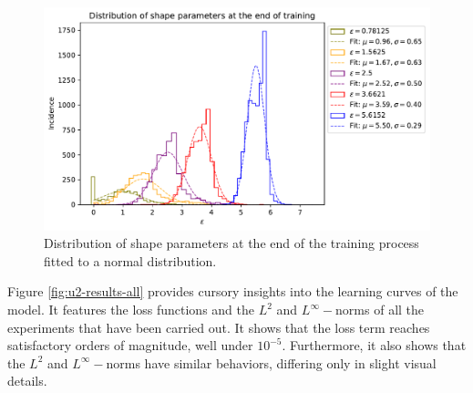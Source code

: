 \documentclass[12pt]{report} %
\begin{document}
\begin{figure}
  \includegraphics[width=\textwidth]{imagenes/experiments/1d/statistical_1d_full_scheduler_interpolation/distribution_of_shape_parameters_at_end_of_training.pdf}
  \caption{Distribution of shape parameters at the end of the training process fitted to a normal distribution.}
  \label{fig:u2-results-shape-parameters}
\end{figure}

Figure \ref{fig:u2-results-all} provides cursory insights into the learning curves of the model. It features the loss functions and the $L^2$ and $L^\infty-$norms of all the experiments that have been carried out. It shows that the loss term reaches satisfactory orders of magnitude, well under $10^{-5}$. Furthermore, it also shows that the $L^2$ and $L^\infty-$norms have similar behaviors, differing only in slight visual details.
\end{document}
